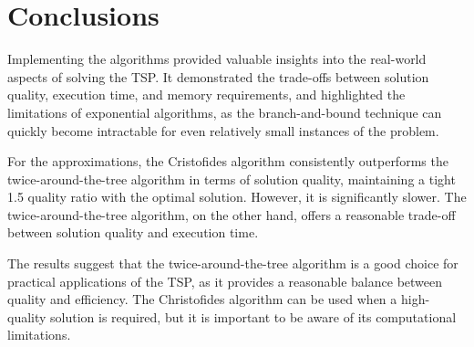 \documentclass[12pt]{article}
\begin{document}
\section{Conclusions} \label{sec:conclusions}

Implementing the algorithms provided valuable insights into the real-world aspects of solving the TSP. 
It demonstrated the trade-offs between solution quality, execution time, and memory requirements, 
and highlighted the limitations of exponential algorithms, as the branch-and-bound technique can 
quickly become intractable for even relatively small instances of the problem.

For the approximations, the Cristofides algorithm consistently outperforms the twice-around-the-tree 
algorithm in terms of solution quality, maintaining a tight 1.5 quality ratio with the optimal 
solution. However, it is significantly slower. The twice-around-the-tree algorithm, on the other hand, 
offers a reasonable trade-off between solution quality and execution time.

The results suggest that the twice-around-the-tree algorithm is a good choice for practical applications of the 
TSP, as it provides a reasonable balance between quality and efficiency. The Christofides algorithm can be used 
when a high-quality solution is required, but it is important to be aware of its computational limitations.



\end{document}
